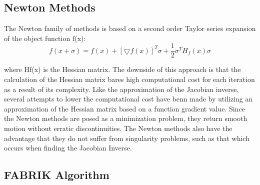 \subsection{Newton Methods}
The Newton family of methods is based on a second order Taylor series expansion of the object function f(x):
\begin{equation}
f(x+\sigma)= f(x)+ [\bigtriangledown f(x)]^{T}\sigma + \frac{1}{2}\sigma^{T}H_{f}(x)\sigma
\end{equation}

where Hf(x) is the Hessian matrix. The downside of this approach is that the calculation of the Hessian matrix bares high computational cost for each iteration as a result of its complexity. Like the approximation of the Jacobian inverse, several attempts to lower the computational cost have benn made by utilizing an approximation of the Hessian matrix based on a function gradient value.
Since the Newton methods are posed as a minimization problem, they return smooth motion without erratic discontinuities.
The Newton methods also have the advantage that they do not suffer from singularity problems, such as that which occurs when finding the Jacobian Inverse.
\newpage
\subsection{FABRIK Algorithm}

